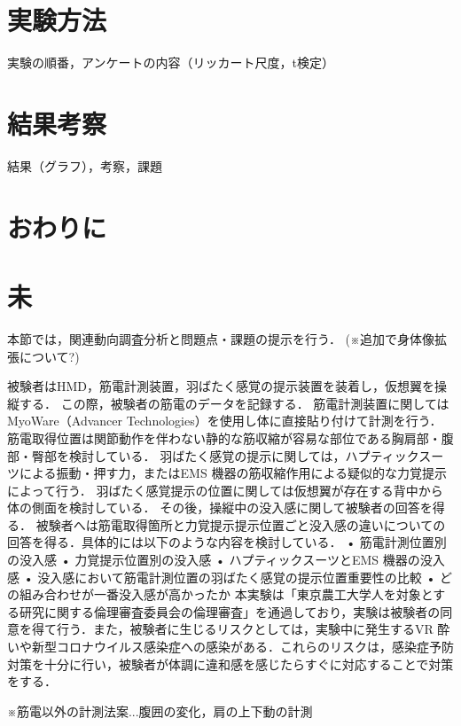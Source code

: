 \section{実験方法}
        

        実験の順番，アンケートの内容（リッカート尺度，t検定）

\section{結果考察}
        結果（グラフ），考察，課題

\section{おわりに}

\section{未}

        本節では，関連動向調査分析と問題点・課題の提示を行う．
        (※追加で身体像拡張について?)



        被験者はHMD，筋電計測装置，羽ばたく感覚の提示装置を装着し，仮想翼を操縦する．
この際，被験者の筋電のデータを記録する．
筋電計測装置に関してはMyoWare（Advancer Technologies）を使用し体に直接貼り付けて計測を行う．
筋電取得位置は関節動作を伴わない静的な筋収縮が容易な部位である胸肩部・腹部・臀部を検討している．
羽ばたく感覚の提示に関しては，ハプティックスーツによる振動・押す力，またはEMS 機器の筋収縮作用による疑似的な力覚提示によって行う．
羽ばたく感覚提示の位置に関しては仮想翼が存在する背中から体の側面を検討している．
その後，操縦中の没入感に関して被験者の回答を得る．
被験者へは筋電取得箇所と力覚提示提示位置ごと没入感の違いについての回答を得る．具体的には以下のような内容を検討している．
• 筋電計測位置別の没入感
• 力覚提示位置別の没入感
• ハプティックスーツとEMS 機器の没入感
• 没入感において筋電計測位置の羽ばたく感覚の提示位置重要性の比較
• どの組み合わせが一番没入感が高かったか
本実験は「東京農工大学人を対象とする研究に関する倫理審査委員会の倫理審査」を通過しており，実験は被験者の同意を得て行う．また，被験者に生じるリスクとしては，実験中に発生するVR 酔いや新型コロナウイルス感染症への感染がある．これらのリスクは，感染症予防対策を十分に行い，被験者が体調に違和感を感じたらすぐに対応することで対策をする．

※筋電以外の計測法案...腹囲の変化，肩の上下動の計測




